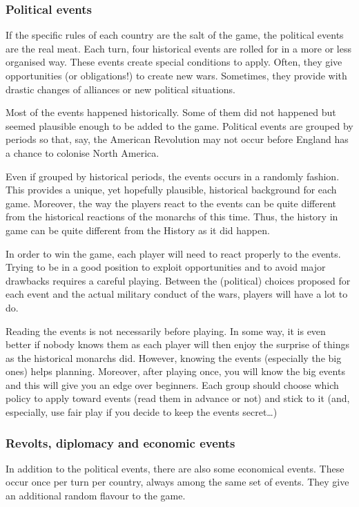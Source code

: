 \subsubsection*{Political events}
If the specific rules of each country are the salt of the game, the political
events are the real meat. Each turn, four historical events are rolled for in
a more or less organised way. These events create special conditions to
apply. Often, they give opportunities (or obligations!) to create new
wars. Sometimes, they provide with drastic changes of alliances or new
political situations.

Most of the events happened historically. Some of them did not happened but
seemed plausible enough to be added to the game. Political events are grouped
by periods so that, say, the American Revolution may not occur before England
has a chance to colonise North America.

Even if grouped by historical periods, the events occurs in a randomly
fashion. This provides a unique, yet hopefully plausible, historical
background for each game. Moreover, the way the players react to the events
can be quite different from the historical reactions of the monarchs of this
time. Thus, the history in game can be quite different from the History as it
did happen.

In order to win the game, each player will need to react properly to the
events. Trying to be in a good position to exploit opportunities and to avoid
major drawbacks requires a careful playing. Between the (political) choices
proposed for each event and the actual military conduct of the wars, players
will have a lot to do.

Reading the events is not necessarily before playing. In some way, it is even
better if nobody knows them as each player will then enjoy the surprise of
things as the historical monarchs did. However, knowing the events (especially
the big ones) helps planning. Moreover, after playing once, you will know the
big events and this will give you an edge over beginners. Each group should
choose which policy to apply toward events (read them in advance or not) and
stick to it (and, especially, use fair play if you decide to keep the events
secret\ldots)

\subsubsection*{Revolts, diplomacy and economic events}
In addition to the political events, there are also some economical
events. These occur once per turn per country, always among the same set of
events. They give an additional random flavour to the game.

